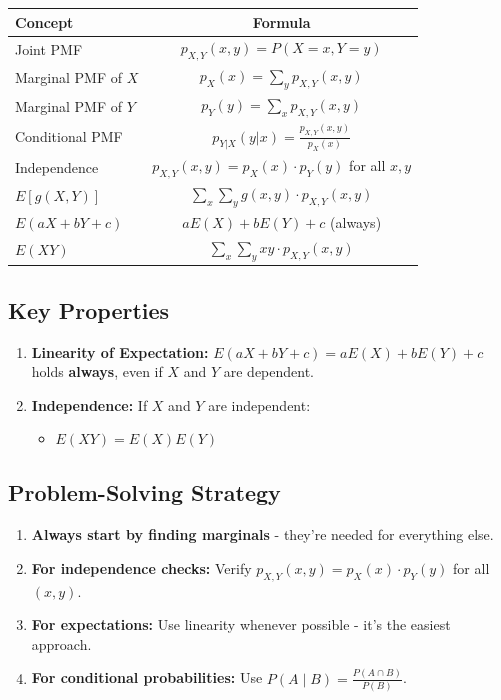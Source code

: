 \begin{center}
\renewcommand{\arraystretch}{1.8}
\begin{tabular}{|l|c|}
\hline
\textbf{Concept} & \textbf{Formula} \\ \hline
\hline
Joint PMF & $p_{X,Y}(x,y) = P(X=x, Y=y)$ \\ \hline
Marginal PMF of $X$ & $p_X(x) = \sum_{y} p_{X,Y}(x,y)$ \\ \hline
Marginal PMF of $Y$ & $p_Y(y) = \sum_{x} p_{X,Y}(x,y)$ \\ \hline
Conditional PMF & $p_{Y|X}(y|x) = \frac{p_{X,Y}(x,y)}{p_X(x)}$ \\ \hline
Independence & $p_{X,Y}(x,y) = p_X(x) \cdot p_Y(y)$ for all $x,y$ \\ \hline
$E[g(X,Y)]$ & $\sum_{x} \sum_{y} g(x,y) \cdot p_{X,Y}(x,y)$ \\ \hline
$E(aX + bY + c)$ & $aE(X) + bE(Y) + c$ (always) \\ \hline
$E(XY)$ & $\sum_{x} \sum_{y} xy \cdot p_{X,Y}(x,y)$ \\ \hline
\end{tabular}
\end{center}

\subsection{Key Properties}

\begin{enumerate}
    \item \textbf{Linearity of Expectation:} $E(aX + bY + c) = aE(X) + bE(Y) + c$ holds \textbf{always}, even if $X$ and $Y$ are dependent.
    
    \item \textbf{Independence:} If $X$ and $Y$ are independent:
    \begin{itemize}
        \item $E(XY) = E(X)E(Y)$
    \end{itemize}
\end{enumerate}

\subsection{Problem-Solving Strategy}

\begin{enumerate}
    \item \textbf{Always start by finding marginals} - they're needed for everything else.
    
    \item \textbf{For independence checks:} Verify $p_{X,Y}(x,y) = p_X(x) \cdot p_Y(y)$ for all $(x,y)$.
    
    \item \textbf{For expectations:} Use linearity whenever possible - it's the easiest approach.
    
    \item \textbf{For conditional probabilities:} Use $P(A \mid B) = \frac{P(A \cap B)}{P(B)}$.
\end{enumerate}

